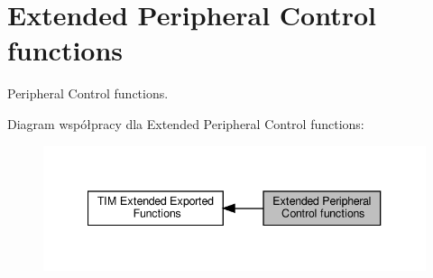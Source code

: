 \hypertarget{group___t_i_m_ex___exported___functions___group5}{}\section{Extended Peripheral Control functions}
\label{group___t_i_m_ex___exported___functions___group5}


Peripheral Control functions.  


Diagram współpracy dla Extended Peripheral Control functions\+:\nopagebreak
\begin{figure}[H]
\begin{center}
\leavevmode
\includegraphics[width=340pt]{group___t_i_m_ex___exported___functions___group5}
\end{center}
\end{figure}
